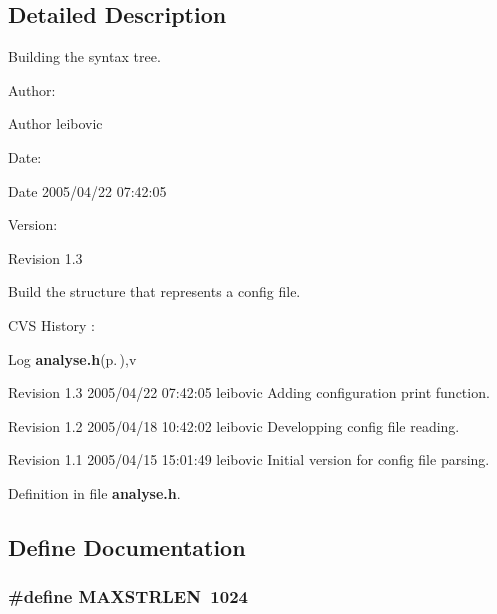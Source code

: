 \subsection{Detailed Description}
Building the syntax tree. 

\begin{Desc}
\item[Author:]\begin{Desc}
\item[Author]leibovic \end{Desc}
\end{Desc}
\begin{Desc}
\item[Date:]\begin{Desc}
\item[Date]2005/04/22 07:42:05 \end{Desc}
\end{Desc}
\begin{Desc}
\item[Version:]\begin{Desc}
\item[Revision]1.3 \end{Desc}
\end{Desc}
Build the structure that represents a config file.

CVS History :

\begin{Desc}
\item[Log]{\bf analyse.h}{\rm (p.\,\pageref{analyse_8h})},v \end{Desc}
Revision 1.3 2005/04/22 07:42:05 leibovic Adding configuration print function.

Revision 1.2 2005/04/18 10:42:02 leibovic Developping config file reading.

Revision 1.1 2005/04/15 15:01:49 leibovic Initial version for config file parsing.

Definition in file {\bf analyse.h}.

\subsection{Define Documentation}
\subsubsection{\setlength{\rightskip}{0pt plus 5cm}\#define MAXSTRLEN\ 1024}\label{analyse_8h_a0}




